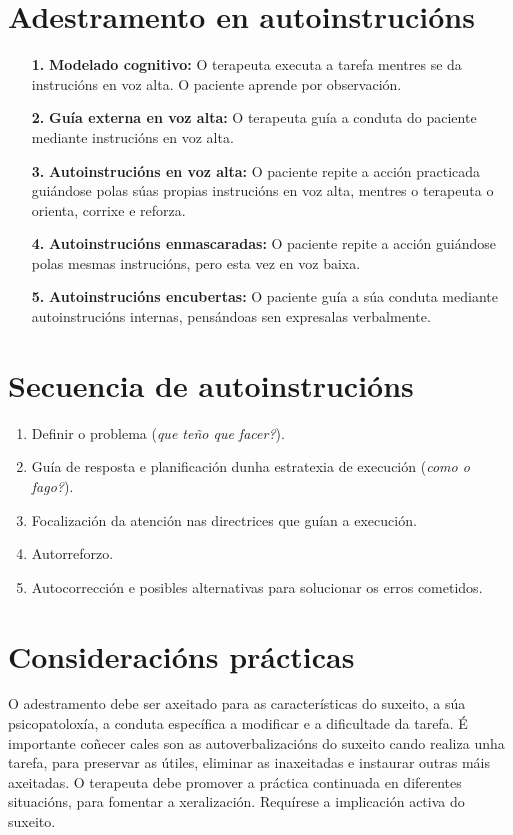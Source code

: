 \documentclass[a4paper,11pt]{article}
\begin{document}
\section{Adestramento en autoinstrucións}
\begin{enumerate}
	\item[\textbf{1.}] \textbf{Modelado cognitivo:} O terapeuta executa a tarefa mentres se da 
	instrucións en voz alta. O paciente aprende por observación.
	\item[\textbf{2.}] \textbf{Guía externa en voz alta:} O terapeuta guía a conduta do paciente 
	mediante instrucións en voz alta.
	\item[\textbf{3.}] \textbf{Autoinstrucións en voz alta:} O paciente repite a acción practicada 
	guiándose polas súas propias instrucións en voz alta, mentres o terapeuta o orienta, corrixe e 
	reforza.
	\item[\textbf{4.}] \textbf{Autoinstrucións enmascaradas:} O paciente repite a acción guiándose 
	polas mesmas instrucións, pero esta vez en voz baixa.
	\item[\textbf{5.}] \textbf{Autoinstrucións encubertas:} O paciente guía a súa conduta mediante 
	autoinstrucións internas, pensándoas sen expresalas verbalmente. 
\end{enumerate}

\section{Secuencia de autoinstrucións}
\begin{enumerate}
	\item Definir o problema (\textit{que teño que facer?}).
	\item Guía de resposta e planificación dunha estratexia de execución (\textit{como o fago?}).
	\item Focalización da atención nas directrices que guían a execución.
	\item Autorreforzo.
	\item Autocorrección e posibles alternativas para solucionar os erros cometidos.
\end{enumerate}

\section{Consideracións prácticas}
O adestramento debe ser axeitado para as características do suxeito, a súa psicopatoloxía, a conduta específica a modificar e a dificultade da tarefa. É importante coñecer cales son as autoverbalizacións do suxeito cando realiza unha tarefa, para preservar as útiles, eliminar as inaxeitadas e instaurar outras máis axeitadas. O terapeuta debe promover a práctica continuada en diferentes situacións, para fomentar a xeralización. Requírese a implicación activa do suxeito.
\end{document}
